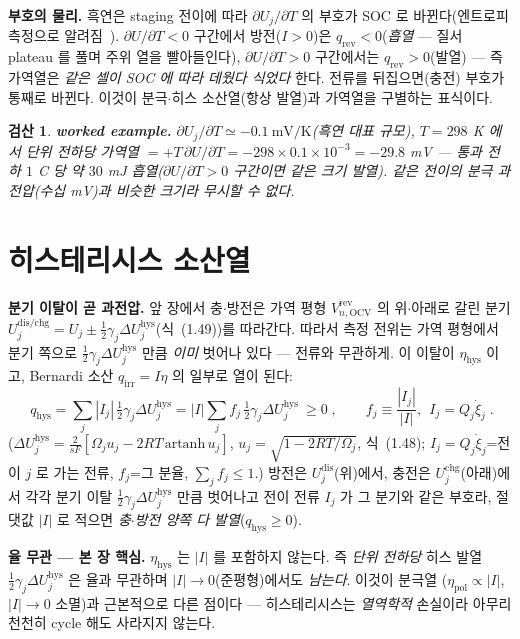 \documentclass[11pt,a4paper]{article}
\newtheorem*{verifybox}{검산}
\newcommand{\OCV}{\mathrm{OCV}}
\newcommand{\dis}{\mathrm{dis}}
\newcommand{\chg}{\mathrm{chg}}
\newcommand{\hys}{\mathrm{hys}}
\newcommand{\pol}{\mathrm{pol}}
\newcommand{\rev}{\mathrm{rev}}
\newcommand{\irr}{\mathrm{irr}}
\begin{document}
\textbf{부호의 물리.} 흑연은 staging 전이에 따라 $\partial U_j/\partial T$ 의 부호가 SOC 로 바뀐다(엔트로피 측정으로
알려짐~\cite{reynier2004}). $\partial U/\partial T<0$ 구간에서 방전($I>0$)은 $q_\rev<0$(\emph{흡열} — 질서 plateau 를 풀며 주위 열을 빨아들인다),
$\partial U/\partial T>0$ 구간에서는 $q_\rev>0$(발열) — 즉 가역열은 \emph{같은 셀이 SOC 에 따라 데웠다 식었다} 한다.
전류를 뒤집으면(충전) 부호가 통째로 바뀐다. 이것이 분극$\cdot$히스 소산열(항상 발열)과 가역열을 구별하는
표식이다.
\begin{verifybox}
\textbf{worked example.} $\partial U_j/\partial T\simeq-0.1\ \mathrm{mV/K}$(흑연 대표 규모), $T=298$ K 에서 단위
전하당 가역열 $=+T\,\partial U/\partial T=-298\times0.1\times10^{-3}=-29.8$ mV — 통과 전하 $1$ C 당 약 $30$ mJ
\emph{흡열}($\partial U/\partial T>0$ 구간이면 같은 크기 발열). 같은 전이의 분극 과전압(수십 mV)과 비슷한 \emph{크기}라
무시할 수 없다.
\end{verifybox}

\section{히스테리시스 소산열}\label{sec:h_hys}
\textbf{분기 이탈이 곧 과전압.} 앞 장에서 충$\cdot$방전은 가역 평형 $V_{n,\OCV}^\rev$ 의 위$\cdot$아래로 갈린
분기 $U_j^{\dis/\chg}=U_j\pm\tfrac12\gamma_j\Delta U_j^\hys$(식~(1.49))를 따라간다. 따라서 측정 전위는 가역 평형에서
분기 쪽으로 $\tfrac12\gamma_j\Delta U_j^\hys$ 만큼 \emph{이미} 벗어나 있다 — 전류와 무관하게. 이 이탈이
$\eta_\hys$ 이고, Bernardi 소산 $q_\irr=I\eta$ 의 일부로 열이 된다:
\begin{equation}
\boxed{\;q_\hys=\sum_j|I_j|\,\tfrac12\gamma_j\Delta U_j^\hys=|I|\sum_jf_j\,\tfrac12\gamma_j\Delta U_j^\hys\ \ge0\;,\qquad
f_j\equiv\frac{|I_j|}{|I|},\ \ I_j=Q_j\dot\xi_j\;.}
\label{eq:h_qhys}
\end{equation}
($\Delta U_j^\hys=\tfrac{2}{sF}[\Omega_j u_j-2RT\,\mathrm{artanh}\,u_j]$, $u_j=\sqrt{1-2RT/\Omega_j}$, 식~(1.48);
$I_j=Q_j\dot\xi_j$=전이 $j$ 로 가는 전류, $f_j$=그 분율, $\sum_jf_j\le1$.) 방전은 $U_j^\dis$(위)에서,
충전은 $U_j^\chg$(아래)에서 각각 분기 이탈 $\tfrac12\gamma_j\Delta U_j^\hys$ 만큼 벗어나고 전이 전류 $I_j$ 가 그
분기와 같은 부호라, 절댓값 $|I|$ 로 적으면 \emph{충$\cdot$방전 양쪽 다 발열}($q_\hys\ge0$).

\textbf{율 무관 — 본 장 핵심.} $\eta_\hys$ 는 $|I|$ 를 포함하지 않는다. 즉 \emph{단위 전하당} 히스 발열
$\tfrac12\gamma_j\Delta U_j^\hys$ 은 율과 무관하며 $|I|\to0$(준평형)에서도 \emph{남는다}. 이것이 분극열
($\eta_\pol\propto|I|$, $|I|\to0$ 소멸)과 근본적으로 다른 점이다 — 히스테리시스는 \emph{열역학적} 손실이라 아무리
천천히 cycle 해도 사라지지 않는다.
\end{document}
